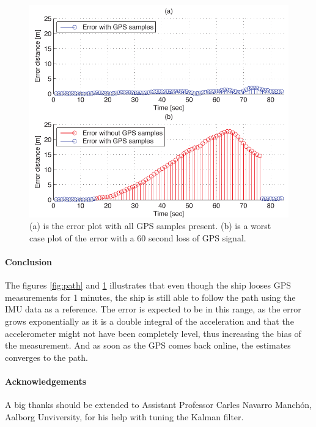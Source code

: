 \documentclass[a0,portrait]{a0poster}
\begin{document}
\begin{center}
{\begin{figure}
	\includegraphics[width=\threecolwidth]{img/error}
  	\caption{(a) is the error plot with all GPS samples present. (b) is a worst case plot of the error with a 60 second loss of GPS signal.}
	\label{fig:error}
\end{figure}


\paragraph{Conclusion}
The figures \ref{fig:path} and \ref{fig:error} illustrates that even though the ship looses GPS measurements for 1 minutes, the ship is still able to follow the path using the IMU data as a reference. The error is expected to be in this range, as the error grows exponentially as it is a double integral of the acceleration and that the accelerometer might not have been completely level, thus increasing the bias of the measurement. And as soon as the GPS comes back online, the estimates converges to the path.

\paragraph{Acknowledgements} A big thanks should be extended to Assistant Professor Carles Navarro Manchón, Aalborg Unviversity, for his help with tuning the Kalman filter. 


}
\end{center}

\makefooter
\end{document}

